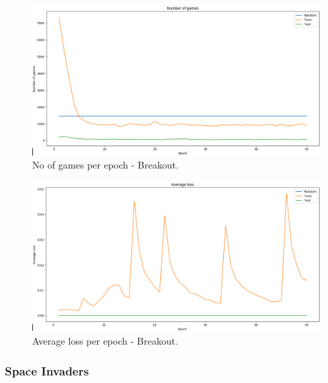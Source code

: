 \documentclass[a4paper,12pt]{report}
\begin{document}
			\begin{figure}[H]
				\begin{centering}
					\includegraphics[width=15cm]{images/breakout_3_nrgames.png}
					\caption{No of games per epoch - Breakout.}
				\end{centering}
			\end{figure}			
			
			\begin{figure}[H]
				\begin{centering}
					\includegraphics[width=15cm]{images/breakout_4_averageloss.png}
					\caption{Average loss per epoch - Breakout.}
				\end{centering}
			\end{figure}			
			
			\newpage
			\subsubsection{Space Invaders}
\end{document}
